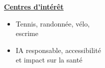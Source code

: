 \documentclass[letterpaper,10pt]{article}
\begin{document}
\begin{minipage}[t]{0.28\textwidth}
  \raggedright
  \textbf{\underline{Centres d'intérêt}}\\[-2pt]
  {\scriptsize
    \begin{itemize}[leftmargin=*,itemsep=1pt,parsep=0pt,topsep=0pt,partopsep=0pt]
      \item Tennis, randonnée, vélo, \\escrime
      \item IA responsable, accessibilité \\et impact sur la santé
    \end{itemize}
  }
\end{minipage}



\end{document}
